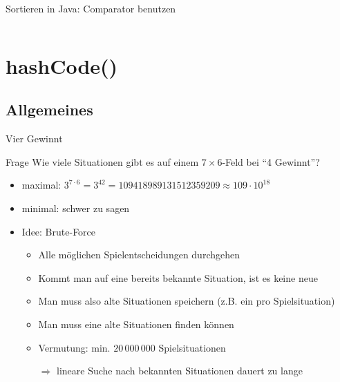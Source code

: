 \documentclass[usepdftitle=false,hyperref={pdfpagelabels=false}]{beamer}
\begin{document}
\begin{frame}{Sortieren in Java: Comparator benutzen}
    \inputminted[linenos=true, numbersep=5pt, tabsize=4, fontsize=\tiny]{java}{ComparatorMain.java}
\end{frame}

\section{hashCode()}
\subsection{Allgemeines}
\begin{frame}{Vier Gewinnt}
    \begin{block}{Frage}
        Wie viele Situationen gibt es auf einem $7 \times 6$-Feld
        bei "`4 Gewinnt"'?
    \end{block}

    \begin{itemize}[<+->]
        \item maximal: $3^{7 \cdot 6} = 3^{42} = 109418989131512359209 \approx 109 \cdot 10^{18}$
        \item minimal: schwer zu sagen
        \item Idee: Brute-Force
        \begin{itemize}
            \item Alle möglichen Spielentscheidungen durchgehen
            \item Kommt man auf eine bereits bekannte Situation, ist es keine neue
            \item Man muss also alte Situationen speichern (z.B. ein  pro Spielsituation)
            \item Man muss eine alte Situationen finden können
            \item Vermutung: min. $20\,000\,000$ Spielsituationen
            \item[$\Rightarrow$] lineare Suche nach bekannten Situationen dauert zu lange
        \end{itemize}
    \end{itemize}
\end{frame}
\end{document}
